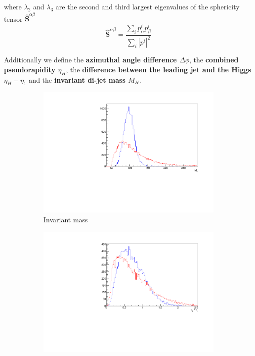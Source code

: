 	where $\lambda_2$ and $\lambda_3$ are the second and third largest eigenvalues of the sphericity tensor $\mathbf{\hat{S}}^{\alpha\beta}$
	\begin{equation}
		\mathbf{\hat{S}}^{\alpha\beta} = \frac{\sum_i p_{\alpha}^i p_{\beta}^i}{\sum_i |p^i|^2}
	\end{equation}



Additionally we define the \textbf{azimuthal angle difference $ \Delta\phi $}, the \textbf{combined pseudorapidity $\eta_H$}, the \textbf{difference between the leading jet and the Higgs $\eta_H - \eta_1$} and the \textbf{invariant di-jet mass $M_H$}.




\begin{figure}[htbp]
	\centering	
	\begin{subfigure}[b]{0.3\textwidth}
	                \includegraphics[width=\textwidth]{img/mh}
	                \caption{Invariant mass}
	                \label{fig:mh}
	\end{subfigure}
	\begin{subfigure}[b]{0.3\textwidth}
	                \includegraphics[width=\textwidth]{img/angle}

\end{subfigure}
\end{figure}
